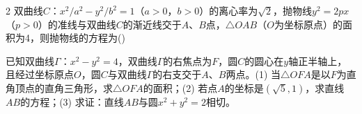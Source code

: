 \documentclass[fontset=none]{ctexart}
\begin{document}
\begin{multicols}{2}
 双曲线\(C\)：\(x^{2}/a^{2}-y^{2}/b^{2}=1\)（\(a>0\)，\(b>0\)）的离心率为\(\sqrt{2}\)，抛物线\(y^{2}=2px\)（\(p>0\)）的准线与双曲线\(C\)的渐近线交于\(A\)、\(B\)点，\(\triangle OAB\)（\(O\)为坐标原点）的面积为4，则抛物线的方程为\nobreak(\kongwei)

\begin{ansblock}[2章-练-课时19-07]
\end{ansblock}


 已知双曲线\(\Gamma\)：\(x^{2}-y^{2}=4\)，双曲线\(\Gamma\)的右焦点为\(F\)，圆\(C\)的圆心在\(y\)轴正半轴上，且经过坐标原点\(O\)，圆\(C\)与双曲线\(\Gamma\)的右支交于\(A\)、\(B\)两点。(1) 当\(\triangle OFA\)是以\(F\)为直角顶点的直角三角形，求\(\triangle OFA\)的面积；(2) 若点\(A\)的坐标是\((\sqrt{5},1)\)，求直线\(AB\)的方程；(3) 求证：直线\(AB\)与圆\(x^{2}+y^{2}=2\)相切。


\end{multicols}
\end{document}
